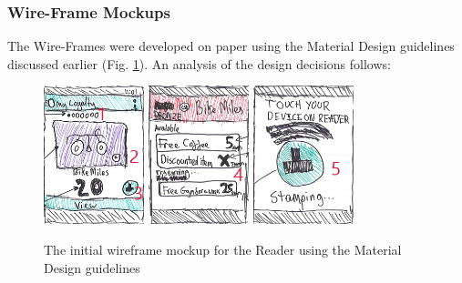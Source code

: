 \subsubsection{Wire-Frame Mockups}
The Wire-Frames were developed on paper using the Material Design guidelines discussed earlier (Fig. \ref{fig:wireframe1}). An analysis of the design decisions follows: 
\begin{figure}[H]
 \centering
  \includegraphics[width=0.26\textwidth]{img/wireframeMockup.png}
    \includegraphics[width=0.26\textwidth]{img/wireframeMockup2.png}
    \includegraphics[width=0.26\textwidth]{img/wireframeMockup3.png}
    \caption{The initial wireframe mockup for the Reader using the Material Design guidelines}
         \label{fig:wireframe1}
\end{figure}

